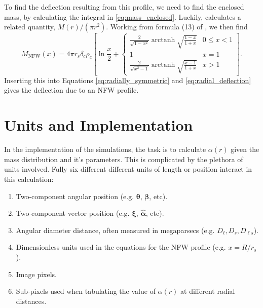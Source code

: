 \documentclass[10pt,twoside]{article}
\theoremstyle{definition}
\theoremstyle{exercise}
\renewcommand{\v}[1]{\boldsymbol{#1}}%
\DeclareMathOperator\arctanh{arctanh}
\begin{document}
To find the deflection resulting from this profile, we need to find the enclosed mass, by calculating the integral in \eqref{eq:mass_enclosed}. Luckily, \cite{brainerd_wright} calculates a related quantity, $M(r)/(\pi r^2)$. Working from formula (13) of \cite{brainerd_wright}, we then find
\begin{equation}
		M_\text{NFW}(x) = 
		4 \pi r_s \delta_c \rho_c \left[\ln \frac{x}{2} + 
		\begin{cases}
				\frac{2}{\sqrt{1-x^2}} \arctanh \sqrt{\frac{1-x}{1+x}} & 0 \le x < 1\\[1.2em]
				1 & x = 1\\[1.2em]
				\frac{2}{\sqrt{x^2-1}} \arctanh \sqrt{\frac{x-1}{1+x}} & x > 1
						\end{cases}
						\right].
		\label{eq:NFW_mass_enclosed}
\end{equation}
Inserting this into Equations \eqref{eq:radially_symmetric} and \eqref{eq:radial_deflection} gives the deflection due to an NFW profile.

\section{Units and Implementation}
\label{sec:units}
In the implementation of the simulations, the task is to calculate $\alpha(r)$ given the mass distribution and it's parameters. This is complicated by the plethora of units involved. Fully six different different units of length or position interact in this calculation:
\begin{enumerate}
		\item Two-component angular position (e.g. $\v{\theta}$, $\v{\beta}$, etc).
		\item Two-component vector position (e.g. $\v{\xi}$, $\hat{\v{\alpha}}$, etc).
		\item Angular diameter distance, often measured in megaparsecs (e.g. $D_\ell, D_s, D_{\ell s}$).
		\item Dimensionless units used in the equations for the NFW profile (e.g. $x = R/r_s$).
		\item Image pixels.
		\item Sub-pixels used when tabulating the value of $\alpha(r)$ at different radial distances.
\end{enumerate}




\end{document}
